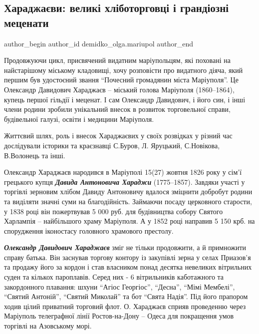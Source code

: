  
 
 
 
 
 
\subsection{Хараджаєви: великі хліботорговці і грандіозні меценати}
\label{sec:22_11_2021.stz.news.ua.mrpl_city.1.haradzhajevy_mecenaty}
 
\ifcmt
 author_begin
   author_id demidko_olga.mariupol
 author_end
\fi

Продовжуючи цикл, присвячений видатним маріупольцям, які поховані на
найстарішому міському кладовищі, хочу розповісти про видатного діяча, який
першим був удостоєний звання \enquote{Почесний громадянин міста Маріуполя}. Це
Олександр Давидович Хараджаєв – міський голова Маріуполя (1860–1864), купець
першої гільдії і меценат. І сам Олександр Давидович, і його син, і інші члени
родини зробили унікальний внесок в розвиток торговельної справи, будівельної
галузі, освіти і медицини Маріуполя.

Життєвий шлях, роль і внесок Хараджаєвих у своїх розвідках у різний час
дослідували історики та краєзнавці С.Буров, Л. Яруцький, С.Новікова, В.Волонець
та інші.

Олександр Хараджаєв народився в Маріуполі 15(27) жовтня 1826 року у сім'ї
грецького купця \textbf{\emph{Давида Антоновича Хараджи}} (1775–1857). Завдяки участі у
торгівлі зерновим хлібом Давиду Антоновичу вдалося зміцнити добробут родини та
виділяти значні суми на благодійність. Займаючи посаду церковного старости, у
1838 році він пожертвував 5 000 руб. для будівництва собору Святого Харлампія –
найбільшого храму Маріуполя. А у 1852 році направив 5 150 крб. на спорудження
іконостасу головного храмового престолу.

\emph{\textbf{Олександр Давидович Хараджаєв}} зміг не тільки продовжити, а й примножити справу
батька.  Він заснував торгову контору із закупівлі зерна у селах Приазов'я та
продажу його за кордон і став власником понад десятка невеликих вітрильних
суден та кількох пароплавів. Серед них - 6 вітрильників каботажного та
закордонного плавання: шхуни \enquote{Агіос Георгіос}, \enquote{Десна}, \enquote{Мімі Мембелі}, \enquote{Святий
Антоній}, \enquote{Святий Миколай} та бот \enquote{Свята Надія}. Під його прапором ходив цілий
приватний торговий флот. О. Хараджаєв сприяв проведенню через Маріуполь
телеграфної лінії Ростов-на-Дону – Одеса для покращення умов торгівлі на
Азовському морі.
